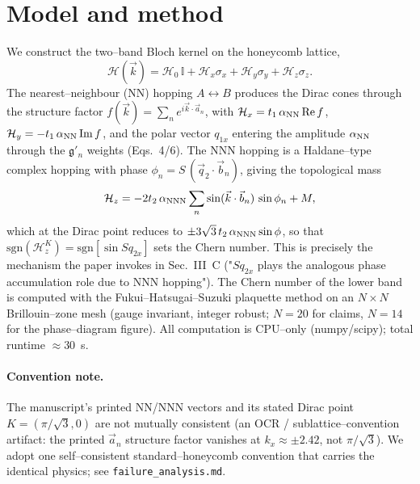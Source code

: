 \documentclass[11pt]{article}
\newcommand{\qax}{q_{1x}}
\newcommand{\qbx}{q_{2x}}
\begin{document}
\section{Model and method}
We construct the two–band Bloch kernel on the honeycomb lattice,
\begin{equation}
\mathcal H(\vec k)=\mathcal H_0\,\mathbb{I}
+\mathcal H_x\sigma_x+\mathcal H_y\sigma_y+\mathcal H_z\sigma_z .
\end{equation}
The nearest–neighbour (NN) hopping $A\!\leftrightarrow\!B$ produces the Dirac
cones through the structure factor $f(\vec k)=\sum_n e^{i\vec k\cdot\vec a_n}$,
with $\mathcal H_x=t_1\,\alpha_{\rm NN}\,\mathrm{Re}\,f$,
$\mathcal H_y=-t_1\,\alpha_{\rm NN}\,\mathrm{Im}\,f$, and the polar vector $\qax$
entering the amplitude $\alpha_{\rm NN}$ through the $\mathfrak{g}'_n$ weights
(Eqs.~4/6). The NNN hopping is a Haldane–type complex hopping with phase
$\phi_n=S\,(\vec q_2\!\cdot\!\vec b_n)$, giving the topological mass
\begin{equation}
\mathcal H_z=-2t_2\,\alpha_{\rm NNN}\sum_n \sin(\vec k\cdot\vec b_n)\,\sin\phi_n
+ M ,
\end{equation}
which at the Dirac point reduces to $\pm 3\sqrt3\,t_2\,\alpha_{\rm NNN}\sin\phi$,
so that $\mathrm{sgn}(\mathcal H_z^{K})=\mathrm{sgn}[\sin S\qbx]$ sets the Chern
number. This is precisely the mechanism the paper invokes in Sec.~III~C
("$S\qbx$ plays the analogous phase accumulation role due to NNN hopping").
The Chern number of the lower band is computed with the Fukui--Hatsugai--Suzuki
plaquette method on an $N\times N$ Brillouin–zone mesh (gauge invariant, integer
robust; $N=20$ for claims, $N=14$ for the phase–diagram figure). All computation
is CPU–only (numpy/scipy); total runtime $\approx 30$~s.

\paragraph{Convention note.} The manuscript's printed NN/NNN vectors and its
stated Dirac point $K=(\pi/\sqrt3,0)$ are not mutually consistent (an OCR /
sublattice–convention artifact: the printed $\vec a_n$ structure factor vanishes
at $k_x\approx\pm2.42$, not $\pi/\sqrt3$). We adopt one self–consistent
standard–honeycomb convention that carries the identical physics; see
\texttt{failure\_analysis.md}.
\end{document}
